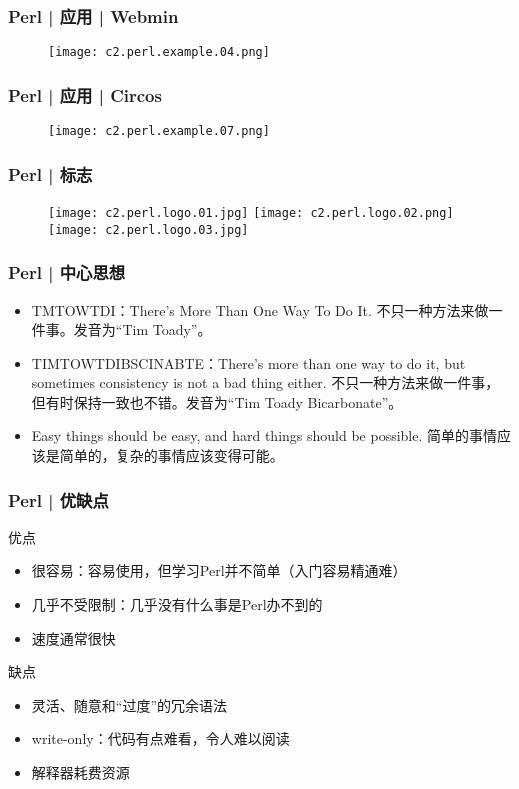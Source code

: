 \begin{frame}
  \frametitle{Perl | 应用 | Webmin}
  \begin{figure}
    \centering
    \texttt{[image: c2.perl.example.04.png]}
  \end{figure}
\end{frame}

\begin{frame}
  \frametitle{Perl | 应用 | Circos}
  \begin{figure}
    \centering
    \texttt{[image: c2.perl.example.07.png]}
  \end{figure}
\end{frame}

\begin{frame}
  \frametitle{Perl | 标志}
  \begin{figure}
    \centering
    \texttt{[image: c2.perl.logo.01.jpg]}
    \hspace{1cm}
    \texttt{[image: c2.perl.logo.02.png]}
    \vspace{0.5cm}
    \texttt{[image: c2.perl.logo.03.jpg]}
  \end{figure}
\end{frame}

\begin{frame}
  \frametitle{Perl | 中心思想}
  \begin{itemize}
    \item \alert{TMTOWTDI}：There's More Than One Way To Do It. 不只一种方法来做一件事。发音为“Tim Toady”。
    \item TIMTOWTDIBSCINABTE：There's more than one way to do it, but sometimes consistency is not a bad thing either.  不只一种方法来做一件事，但有时保持一致也不错。发音为“Tim Toady Bicarbonate”。
    \item Easy things should be easy, and hard things should be possible. 简单的事情应该是简单的，复杂的事情应该变得可能。
  \end{itemize}
\end{frame}

\begin{frame}
  \frametitle{Perl | 优缺点}
  \begin{block}{优点}
    \begin{itemize}
      \item 很容易：容易使用，但学习Perl并不简单（入门容易精通难）
      \item 几乎不受限制：几乎没有什么事是Perl办不到的
      \item 速度通常很快
    \end{itemize}
  \end{block}
  \pause
  \begin{block}{缺点}
    \begin{itemize}
      \item 灵活、随意和“过度”的冗余语法
      \item write-only：代码有点难看，令人难以阅读
      \item 解释器耗费资源
    \end{itemize}
  \end{block}
\end{frame}

